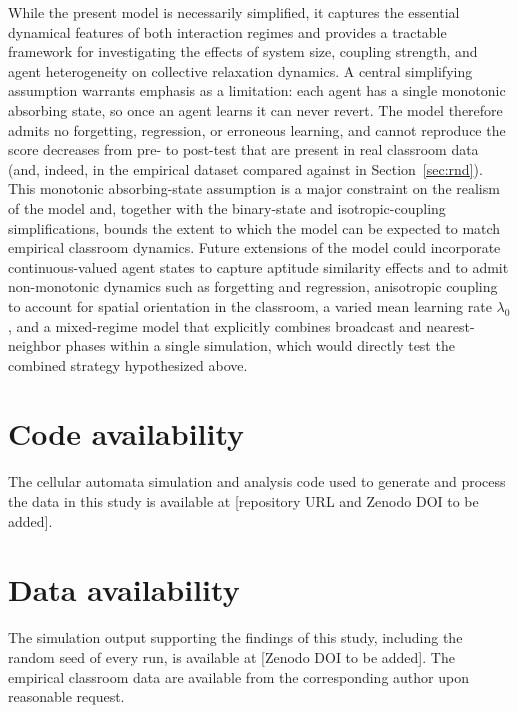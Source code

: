 \documentclass[a4paper,fleqn]{cas-sc}
\begin{document}
While the present model is necessarily simplified, it captures the essential dynamical features of both interaction regimes and provides a tractable framework for investigating the effects of system size, coupling strength, and agent heterogeneity on collective relaxation dynamics.
A central simplifying assumption warrants emphasis as a limitation: each agent has a single monotonic absorbing state, so once an agent learns it can never revert. The model therefore admits no forgetting, regression, or erroneous learning, and cannot reproduce the score decreases from pre- to post-test that are present in real classroom data (and, indeed, in the empirical dataset compared against in Section~\ref{sec:rnd}). This monotonic absorbing-state assumption is a major constraint on the realism of the model and, together with the binary-state and isotropic-coupling simplifications, bounds the extent to which the model can be expected to match empirical classroom dynamics.
Future extensions of the model could incorporate continuous-valued agent states to capture aptitude similarity effects and to admit non-monotonic dynamics such as forgetting and regression, anisotropic coupling to account for spatial orientation in the classroom, a varied mean learning rate $\lambda_0$, and a mixed-regime model that explicitly combines broadcast and nearest-neighbor phases within a single simulation, which would directly test the combined strategy hypothesized above.

\section*{Code availability}
The cellular automata simulation and analysis code used to generate and process the data in this study is available at [repository URL and Zenodo DOI to be added].

\section*{Data availability}
The simulation output supporting the findings of this study, including the random seed of every run, is available at [Zenodo DOI to be added]. The empirical classroom data are available from the corresponding author upon reasonable request.

\end{document}
